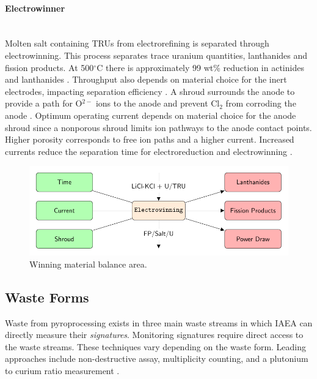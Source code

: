 \paragraph{Electrowinner} \mbox{}\\
Molten salt containing \glspl{TRU} from electrorefining is separated through electrowinning. This process separates trace uranium quantities, lanthanides and fission products. 
At 500$^{\circ}$C there is approximately 99 wt\% reduction in actinides and lanthanides \cite{flowsheet_1998}. 
Throughput also depends on material choice for the inert electrodes, impacting separation 
efficiency \cite{koyama_development_2012}. A shroud surrounds the anode to provide a path for O$^{2-}$ ions to the anode and 
prevent Cl$_2$ from corroding the anode \cite{kim_development_2013,choi_electrochemical_2015}. Optimum operating current 
depends on material choice for the anode shroud since a nonporous shroud limits ion pathways to the anode contact points.
Higher porosity corresponds to free ion paths and a higher current. Increased currents reduce the separation time for electroreduction and electrowinning \cite{choi_electrochemical_2015}.

\begin{figure}[h] 
	\centering
	\includegraphics[width=0.8\linewidth]{images/winning}
	\caption{Winning material balance area.}
	\label{fig:winning}
\end{figure}

\subsection{Waste Forms}

Waste from pyroprocessing exists in three main waste streams in which IAEA can directly measure their \emph{signatures}. Monitoring signatures require direct access to the waste streams.
These techniques vary depending on the waste form. Leading approaches include non-destructive assay, multiplicity counting, and a plutonium to curium ratio measurement \cite{lee_determination_2012,noauthor_non-destructive_nodate}.

